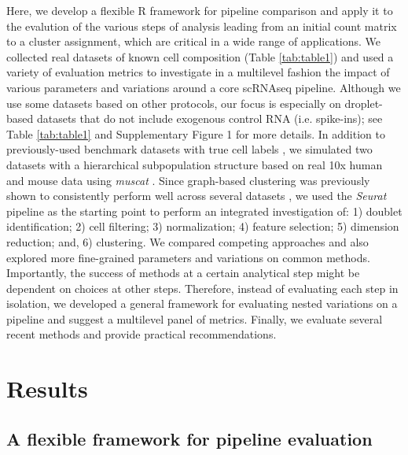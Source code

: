 \documentclass{bmcart}
\begin{document}
Here, we develop a flexible R framework for pipeline comparison and apply it to the evalution of the various steps of analysis leading from an initial count matrix to a cluster assignment, which are critical in a wide range of applications. We collected real datasets of known cell composition (Table \ref{tab:table1}) and used a variety of evaluation metrics to investigate in a multilevel fashion the impact of various parameters and variations around a core scRNAseq pipeline. Although we use some datasets based on other protocols, our focus is especially on droplet-based datasets that do not include exogenous control RNA (i.e. spike-ins); see Table \ref{tab:table1} and Supplementary Figure 1 for more details. In addition to previously-used benchmark datasets with true cell labels \cite{duoClustering2018,tianMixology2018}, we simulated two datasets with a hierarchical subpopulation structure based on real 10x human and mouse data using \textit{muscat} \cite{CrowellMuscat2019}. 
Since graph-based clustering \cite{satijaSeurat2015} was previously shown to consistently perform well across several datasets \cite{duoClustering2018,tianMixology2018}, we used the \textit{Seurat} pipeline as the starting point to perform an integrated investigation of: 1) doublet identification; 2) cell filtering; 3) normalization; 4) feature selection; 5) dimension reduction; and, 6) clustering. We compared competing approaches and also explored more fine-grained parameters and variations on common methods. Importantly, the success of methods at a certain analytical step might be dependent on choices at other steps. Therefore, instead of evaluating each step in isolation, we developed a general framework for evaluating nested variations on a pipeline and suggest a multilevel panel of metrics. Finally, we evaluate several recent methods and provide practical recommendations.

\section*{Results}

\subsection*{A flexible framework for pipeline evaluation}
\end{document}

